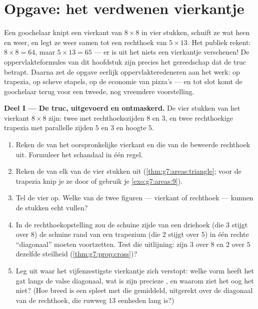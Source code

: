 \section{Opgave: het verdwenen vierkantje}

\begin{problem}[{Weekendopgave --- een beroemd ``bewijs'' dat $64 = 65$, ontmaskerd
met oppervlaktes en hellingen, met pizza's en ringen als nagerecht}]
\label{pb:g7:areas:1}
Een goochelaar knipt een vierkant van $8 \times 8$ in vier stukken, schuift ze wat
heen en weer, en legt ze weer samen tot een rechthoek van $5 \times 13$. Het publiek
rekent: $8 \times 8 = 64$, maar $5 \times 13 = 65$ --- er is uit het niets een
vierkantje verschenen! De oppervlakteformules van dit hoofdstuk zijn precies het
gereedschap dat de truc betrapt. Daarna zet de opgave eerlijk
oppervlakteredeneren aan het werk: op trapezia, op scheve stapels, op de economie van
pizza's --- en tot slot komt de goochelaar terug voor een tweede, nog vreemdere
voorstelling.

\medskip
\noindent\textbf{Deel I --- De truc, uitgevoerd en ontmaskerd.}
De vier stukken van het vierkant $8 \times 8$ zijn: twee  met
rechthoekszijden $8$ en $3$, en twee rechthoekige trapezia met parallelle zijden $5$
en $3$ en hoogte $5$.
\begin{enumerate}
  \item Reken de  van het oorspronkelijke vierkant en die van de beweerde
        rechthoek uit. Formuleer het schandaal in één regel.
  \item Reken de  van elk van de vier stukken uit
        (\cref{thm:g7:areas:triangle}; voor de trapezia knip je ze door of gebruik
        je \cref{exo:g7:areas:9}).
  \item Tel de vier  op. Welke van de twee figuren --- vierkant of
        rechthoek --- kunnen de stukken echt vullen?
  \item In de rechthoekopstelling zou de schuine zijde van een driehoek (die $3$
        stijgt over $8$) de schuine rand van een trapezium (die $2$ stijgt over $5$)
        in één rechte ``diagonaal'' moeten voortzetten. Test die uitlijning: zijn $3$
        over $8$ en $2$ over $5$ dezelfde steilheid
        (\cref{thm:g7:prop:cross})?
  \item Leg uit waar het vijfenzestigste vierkantje zich verstopt: welke vorm heeft
        het gat langs de valse diagonaal, wat is zijn precieze , en waarom
        ziet het oog het niet? (Hoe breed is een spleet met die  gemiddeld,
        uitgerekt over de diagonaal van de rechthoek, die ruwweg $13$ eenheden lang
        is?)
\end{enumerate}


\end{problem}

